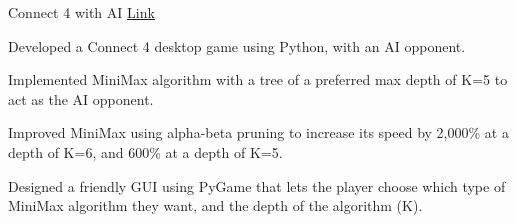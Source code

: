 

\begin{cventries}

  \cventry
    {Connect 4 with AI} %
    {} %
    {}
    {\textcolor{link}{\href{https://github.com/ad3ldev/Connect4-with-AI}{Link}}} %
    {
      \begin{cvitems} %
        \item {Developed a Connect 4 desktop game using Python, with an AI opponent.}
        \item {Implemented MiniMax algorithm with a tree of a preferred max depth of K=5 to act as the AI opponent.}
        \item {Improved MiniMax using alpha-beta pruning to increase its speed by  2,000\% at a depth of K=6, and 600\% at a depth of K=5.}
        \item {Designed a friendly GUI using PyGame that lets the player choose which type of MiniMax algorithm they want, and the depth of the algorithm (K).}
      \end{cvitems}
    }
    
\end{cventries}

